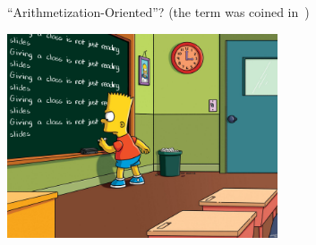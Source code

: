 \documentclass[presentation,aspectratio=1610]{beamer}
\begin{document}
\begin{frame}{``Arithmetization-Oriented''?}
  (the term was coined in~\cite{ToSC:AABDS20})
  
  \vfill

  \begin{center}
    \includegraphics[width=8cm]{./figures/simpsons}
  \end{center}
  
  \vfill

\end{frame}
\end{document}
